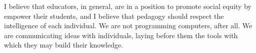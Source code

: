 \documentclass[11pt]{article}
\begin{document}
I believe that educators, in general, are in a position to promote
social equity by empower their students, and I believe that pedagogy
should respect the intelligence of each individual. We are not
programming computers, after all. We are communicating ideas with
individuals, laying before them the tools with which they may build
their knowledge.

\label{page:last}
\end{document}

